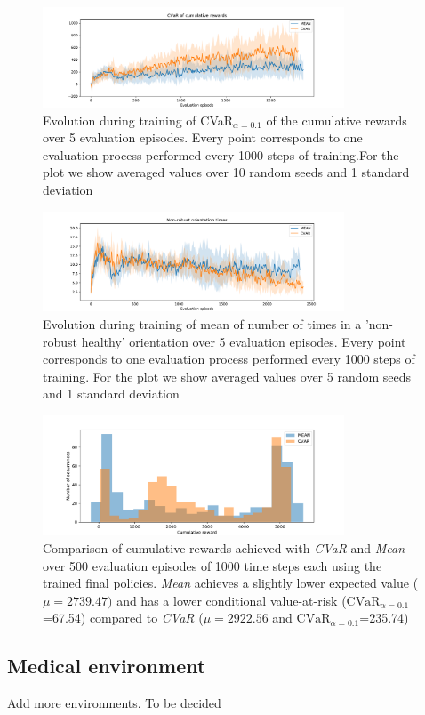 \begin{figure}[ht]
    \centering
    \includegraphics[width=0.8\textwidth]{images/Walker_offpolicy_expert/cvar_train_withstds.pdf}
    \caption{Evolution during training of CVaR$_{\alpha=0.1}$ of the cumulative rewards over 5 evaluation episodes.
    Every point corresponds to one evaluation process performed every 1000 steps of training.For the plot we
    show averaged values over 10 random seeds and 1 standard deviation}
    \label{fig:cvar_walker}

\end{figure}



\begin{figure}[ht]
    \centering
    \includegraphics[width=0.8\textwidth]{images/Walker_offpolicy_expert/times_exceedvel_withstds.pdf}
    \caption{Evolution during training of mean of number of times in a 'non-robust healthy'
    orientation over  5 evaluation episodes.
    Every point corresponds to one evaluation process performed every 1000 steps of training.
    For the plot we show averaged values over 5 random seeds and 1 standard deviation
    }
    \label{fig:vel_exceed_walker}

\end{figure}

\begin{figure}[ht]
\centering
\includegraphics[width=0.8\textwidth]{images/Walker_offpolicy_expert/hist_evaluation_numevalsteps1000.pdf}
\caption{Comparison of cumulative rewards achieved with \textit{CVaR} and \textit{Mean}
over 500 evaluation episodes of 1000 time steps each using the trained final policies.
\textit{Mean} achieves a slightly lower expected value ($\mu=2739.47)$ and 
has a lower conditional value-at-risk ($\text{CVaR}_{\alpha= 0.1}$=67.54) compared to
\textit{CVaR} ($\mu=2922.56$ and $\text{CVaR}_{\alpha= 0.1}$=235.74)}
\label{fig:hist_cum_rewards_walker}
\end{figure}

\clearpage
\subsection{Medical environment}
Add more environments. To be decided